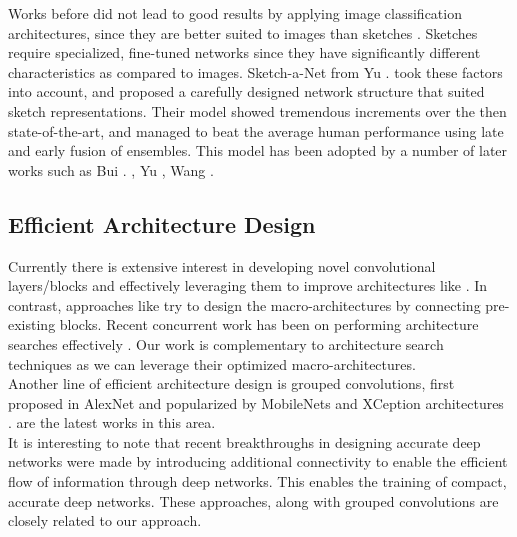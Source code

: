 \noindent Works before \cite{yu2015sketch} did not lead to good results by applying image classification architectures, since they are better suited to images than sketches \cite{yu2015sketch}. Sketches require specialized, fine-tuned networks since they have significantly different characteristics as compared to images. Sketch-a-Net from Yu \etal. \cite{yu2015sketch, yu2017sketch} took these factors into account, and proposed a carefully designed network structure that suited sketch representations. Their model showed tremendous increments over the then state-of-the-art, and managed to beat the average human performance using late and early fusion of ensembles. This model has been adopted by a number of later works such as Bui \etal. \cite{bui2016sbir}, Yu \etal \cite{yu2016shoe}, Wang \etal \cite{wang2016crossir}.

\subsection{Efficient Architecture Design}

\noindent Currently there is extensive interest in developing novel convolutional layers/blocks and effectively leveraging them to improve architectures like \cite{iandola2016squeezenet, howard2017mobilenets, hu2017squeeze}. In contrast, approaches like \cite{szegedy2015going} try to design the macro-architectures by connecting pre-existing blocks. Recent concurrent work has been on performing architecture searches effectively \cite{liu2017hierarchical, zoph2017learning,zhong2017practical, liu2017progressive}. Our work is complementary to architecture search techniques as we can leverage their optimized macro-architectures.\\

\noindent Another line of efficient architecture design is grouped convolutions, first proposed in AlexNet\cite{alex2012alexnet} and popularized by MobileNets\cite{howard2017mobilenets} and XCeption\cite{chollet2017xception} architectures .  \cite{zhang2018shufflenet, sandler2018inverted, huang2018condensenet} are the latest works in this area.\\

\noindent It is interesting to note that recent breakthroughs in designing accurate deep networks \cite{he2016deep, huang2017densely} were made by introducing additional connectivity to enable the efficient flow of information through deep networks. This enables the training of compact, accurate deep networks. These approaches, along with grouped convolutions are closely related to our approach. 

